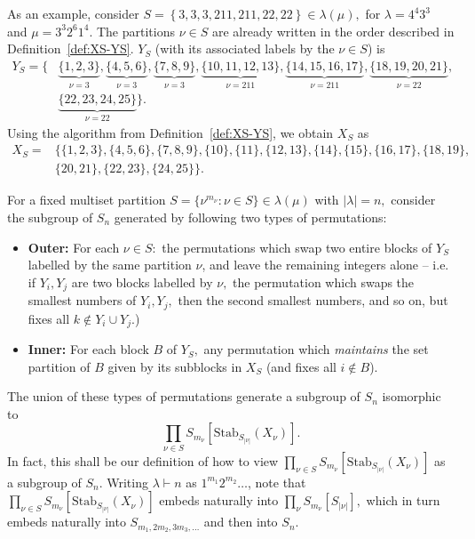 \documentclass[ALCO, Unicode]{cedram}
\def\stab{\mathrm{Stab}}
\begin{document}
\begin{exam}\label{Ex:XS.YS}
    As an example, consider $S = \left\{3, 3, 3, 211, 211, 22, 22\right\} \in \lambda(\mu),$ for  $\lambda = 4^4 3^3$ and $\mu = 3^3 2^6 1^4.$ The partitions $\nu \in S$ are already written in the order described in Definition~\ref{def:XS-YS}. $Y_S$ (with its associated labels by the $\nu \in S$) is
   \begin{align*}
   Y_S = \Bigg\{&\underbrace{\{1, 2, 3\}}_{\nu = 3}, \underbrace{\{4, 5, 6\}}_{\nu = 3}, \underbrace{\{7, 8, 9\}}_{\nu = 3}, \underbrace{\{10, 11, 12, 13\}}_{\nu = 211}, \underbrace{\{14, 15, 16, 17\}}_{\nu = 211}, \underbrace{\{18, 19, 20, 21\}}_{\nu = 22},\\ &\underbrace{\{22, 23, 24, 25\}}_{\nu = 22}\Bigg\}.
   \end{align*} 
   Using the algorithm from Definition~\ref{def:XS-YS}, we obtain $X_S$ as
   \begin{align*}
        X_S =& \Big\{\{1, 2, 3\}, \{4, 5, 6\}, \{7, 8, 9\}, \{10\}, \{11\}, \{12, 13\}, \{14\}, \{15\}, \{16, 17\}, \{18, 19\},\\& \{20, 21\}, \{22, 23\}, \{24, 25\} \Big\}.
   \end{align*}
\end{exam}
For a fixed multiset partition $S = \{\nu^{m_{\nu}}: \nu \in S\} \in \lambda(\mu)$ with $|\lambda| = n,$ consider the subgroup of $S_n$ generated by following two types of permutations:
\begin{itemize}
    \item \textbf{Outer:} For each $\nu \in S:$ the permutations which swap two entire blocks of $Y_S$ labelled by the same partition $\nu$, and leave the remaining integers alone -- i.e. if $Y_i, Y_j$ are two blocks labelled by $\nu,$ the permutation which swaps the smallest numbers of $Y_i,Y_j,$ then the second smallest numbers, and so on, but fixes all $k \notin Y_i \cup Y_j$.)
    \item \textbf{Inner:} For each block $B$ of $Y_S,$ any permutation which \textit{maintains} the set partition of $B$ given by its subblocks in $X_S$ (and fixes all $i \notin B$). 
\end{itemize}
The union of these types of permutations generate a subgroup of $S_n$ isomorphic to \[\prod_{\nu \in S} S_{m_\nu}\left[\stab_{S_{|\nu|}}\left(X_\nu\right)\right].\] In fact, this shall be our definition of how to view $\prod_{\nu \in S} S_{m_\nu}\left[\stab_{S_{|\nu|}}\left(X_\nu\right)\right]$ as a subgroup of $S_n.$ Writing $\lambda \vdash n$ as $1^{m_1}2^{m_2}\ldots$, note that $\prod_{\nu \in S} S_{m_\nu}\left[\stab_{S_{|\nu|}}\left(X_\nu\right)\right]$ embeds naturally into $\prod_{\nu}S_{m_\nu}\left[S_{|\nu|}\right],$ which in turn embeds naturally into $S_{m_1, 2 m_2, 3 m_3, \ldots}$ and then into $S_n.$ 
\end{document}
